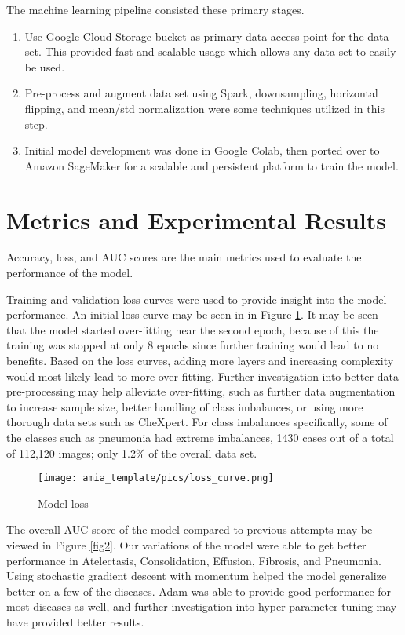 \documentclass{amia}
\begin{document}
The machine learning pipeline consisted these primary stages.
\begin{enumerate}
  \item Use Google Cloud Storage bucket as primary data access point for the data set. This provided fast and scalable usage which allows any data set to easily be used.
  \item Pre-process and augment data set using Spark, downsampling, horizontal flipping, and mean/std normalization were some techniques utilized in this step.
  \item Initial model development was done in Google Colab, then ported over to Amazon SageMaker for a scalable and persistent platform to train the model.
\end{enumerate}

\section*{Metrics and Experimental Results}
Accuracy, loss, and AUC scores are the main metrics used to evaluate the performance of the model.


Training and validation loss curves were used to provide insight into the model performance. An initial loss curve may be seen in in Figure \ref{fig1}. It may be seen that the model started over-fitting near the second epoch, because of this the training was stopped at only 8 epochs since further training would lead to no benefits. Based on the loss curves, adding more layers and increasing complexity would most likely lead to more over-fitting. Further investigation into better data pre-processing may help alleviate over-fitting, such as further data augmentation to increase sample size, better handling of class imbalances, or using more thorough data sets such as CheXpert. For class imbalances specifically, some of the classes such as pneumonia had extreme imbalances, 1430  cases  out  of  a total of 112,120 images;  only 1.2\% of the overall data set.

\begin{figure}[h!]
\centering
\texttt{[image: amia\_template/pics/loss\_curve.png]}
\caption{Model loss}
\label{fig1}
\end{figure}

The overall AUC score of the model compared to previous attempts may be viewed in Figure \ref{fig2}. Our variations of the model were able to get better performance in Atelectasis, Consolidation, Effusion, Fibrosis, and Pneumonia. Using stochastic gradient descent with momentum helped the model generalize better on a few of the diseases. Adam was able to provide good performance for most diseases as well, and further investigation into hyper parameter tuning may have provided better results.
\end{document}
